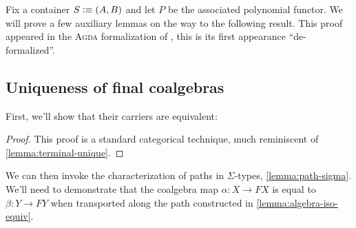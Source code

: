 \documentclass[12pt,twoside]{reedthesis}
\let\oldindex\index
\renewcommand{\index}[1]
               {\oldindex{#1}\marginpar{\footnotesize\color{index}index: #1}}
\newcommand{\indeX}{\oldindex}
\newcommand{\indeX}{\index}
\newcommand{\TODO}[1]{\marginpar{\footnotesize\color{TODO}todo: #1}}
\newcommand{\software}[1]{{\textsc{#1}}\indeX{#1}}
\newcommand{\Agda}{\software{Agda}}
\newcommand{\Coalgtype}{\ensuremath{\ttfun{Coalg}}}
\newcommand{\Final}{\ensuremath{\ttfun{Final}}}
\begin{document}
Fix a container $S\vcentcolon\equiv (A,B)$ and let $P$ be the associated polynomial functor.
We will prove a few auxiliary lemmas on the way to the following result.
This proof appeared in the \Agda{} formalization of \cite{non-wellfounded}, this
is its first appearance ``de-formalized''.

\subsection{Uniqueness of final coalgebras}
\label{subsec:uniqueness}


First, we'll show that their carriers are equivalent:

\begin{proof}
  This proof is a standard categorical technique, much reminiscent of
  \cref{lemma:terminal-unique}.
	\TODO{proof}
\end{proof}

We can then invoke the characterization of paths in $Σ$-types,
\cref{lemma:path-sigma}. We'll need to demonstrate that the coalgebra map
$α:X\to FX$ is equal to $β:Y\to FY$ when transported along the path
constructed in \cref{lemma:algebra-iso-equiv}.
\end{document}
